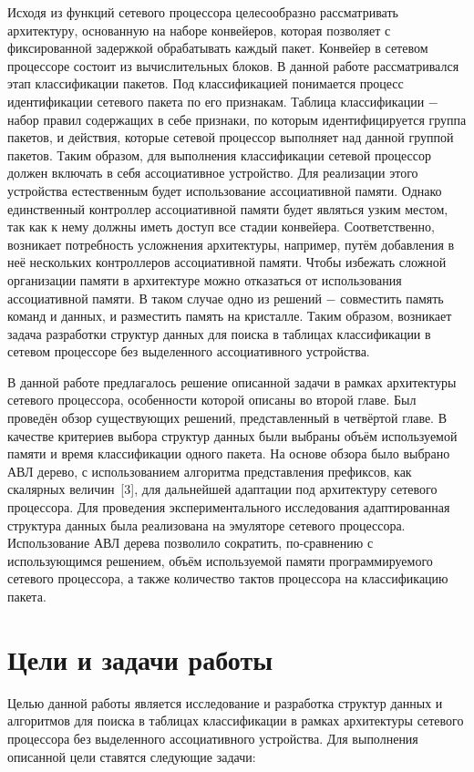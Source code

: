 \documentclass[a4paper, 12pt, titlepage, finall]{extreport}
\begin{document}
        Исходя из функций сетевого процессора целесообразно рассматривать архитектуру, основанную на
        наборе конвейеров, которая позволяет с фиксированной задержкой обрабатывать каждый пакет. 
        Конвейер в сетевом процессоре состоит из вычислительных блоков. В данной работе рассматривался этап классификации пакетов. 
        Под классификацией понимается процесс идентификации сетевого пакета по его признакам.
        Таблица классификации $-$ набор правил содержащих в себе признаки, по которым идентифицируется группа пакетов,
        и действия, которые сетевой процессор выполняет над данной группой пакетов. 
        Таким образом, для выполнения классификации сетевой процессор должен включать в себя ассоциативное устройство. Для реализации этого устройства естественным будет использование 
        ассоциативной памяти. Однако единственный контроллер ассоциативной памяти будет являться узким местом, так как к нему должны иметь доступ все стадии конвейера.
        Соответственно, возникает потребность усложнения архитектуры, например, путём добавления в неё нескольких контроллеров ассоциативной памяти.
        Чтобы избежать сложной организации памяти в архитектуре можно отказаться от использования ассоциативной памяти. 
        В таком случае одно из решений $-$ совместить память команд и данных, и разместить память на кристалле.
        Таким образом, возникает задача разработки структур данных для поиска в таблицах классификации в сетевом процессоре без выделенного ассоциативного устройства.
        
        В данной работе предлагалось решение описанной задачи в рамках архитектуры сетевого процессора, особенности которой описаны во второй главе.
        Был проведён обзор существующих решений, представленный в четвёртой главе. 
        В качестве критериев выбора структур данных были выбраны объём используемой памяти и время классификации одного пакета.
        На основе обзора было выбрано АВЛ дерево, с использованием алгоритма представления префиксов, как скалярных величин~[3], 
        для дальнейшей адаптации под архитектуру сетевого процессора. 
        Для проведения экспериментального исследования адаптированная структура данных была реализована на эмуляторе сетевого процессора.
        Использование АВЛ дерева позволило сократить, по-сравнению с использующимся решением,
        объём используемой памяти программируемого сетевого процессора, а также количество тактов процессора на классификацию пакета.



    \chapter{Цели и задачи работы}
        Целью данной работы является исследование и разработка структур данных и алгоритмов для поиска в таблицах классификации 
        в рамках архитектуры сетевого процессора без выделенного ассоциативного устройства.
        Для выполнения описанной цели ставятся следующие задачи:
\end{document}
